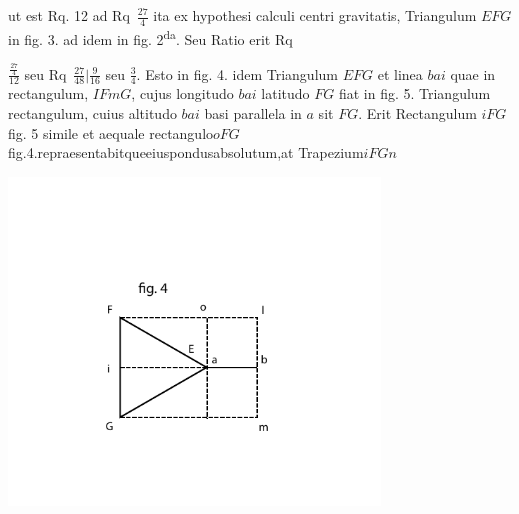  ut est Rq. 12 ad Rq~$\displaystyle\frac{27}{4}$ ita 
ex hypothesi calculi centri gravitatis\protect{}, Triangulum $EFG$ in fig. 3. ad idem in fig. 2\textsuperscript{da}. Seu Ratio erit Rq~\protect\rule[-4mm]{0mm}{10mm}$\displaystyle\frac{\displaystyle\frac{27}{4}}{12}$ seu Rq~$\displaystyle\frac{27}{48}\bigg \vert\frac{9}{16}$ seu $\displaystyle\frac{3}{4}$.
\pend
\pstart
Esto in fig. 4. idem Triangulum $EFG$ et linea  $bai$ quae in  rectangulum, $IFmG$, cujus longitudo $bai$ latitudo $FG$ fiat in fig. 5. Triangulum rectangulum, cuius altitudo $bai$ basi parallela in $a$ sit $FG$. Erit Rectangulum $iFG$ fig. 5 simile et aequale rectangulo\hfill $oFG$\hfill fig.\hfill 4.\hfill repraesentabitque\hfill eius\hfill pondus\protect{}\hfill absolutum,\hfill at Trapezium\hfill $iFGn$
\pend
\pstart
\begin{minipage}[t]{0.5\textwidth}
\hspace{-9mm}
\includegraphics[width=0.74\textwidth]{images/LH037,05_135-d4.pdf}
\end{minipage}
\hspace{11mm}
